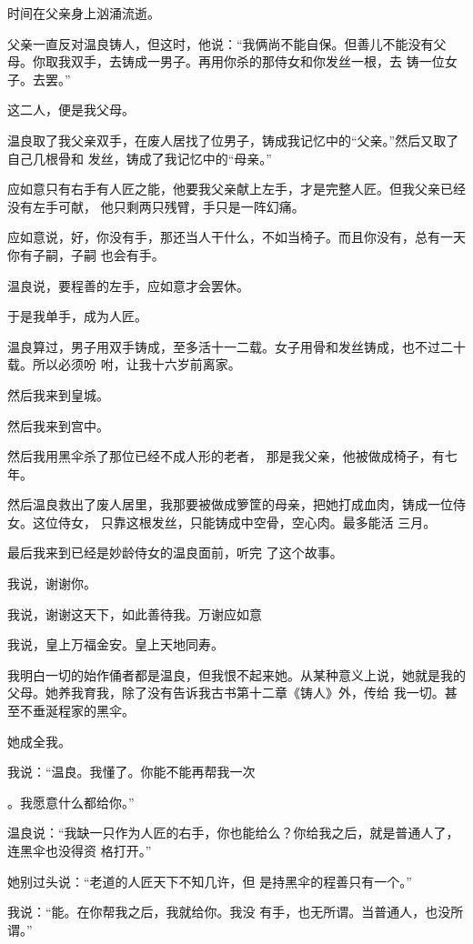 \documentclass{article}
\begin{document}
时间在父亲身上汹涌流逝。 

父亲一直反对温良铸人，但这时，他说：“我俩尚不能自保。但善儿不能没有父母。你取我双手，去铸成一男子。再用你杀的那侍女和你发丝一根，去
铸一位女子。去罢。” 


这二人，便是我父母。 

温良取了我父亲双手，在废人居找了位男子，铸成我记忆中的“父亲。”然后又取了自己几根骨和
发丝，铸成了我记忆中的“母亲。” 

应如意只有右手有人匠之能，他要我父亲献上左手，才是完整人匠。但我父亲已经没有左手可献，
他只剩两只残臂，手只是一阵幻痛。 

\newpage

应如意说，好，你没有手，那还当人干什么，不如当椅子。而且你没有，总有一天你有子嗣，子嗣
也会有手。 


温良说，要程善的左手，应如意才会罢休。 


于是我单手，成为人匠。 

温良算过，男子用双手铸成，至多活十一二载。女子用骨和发丝铸成，也不过二十载。所以必须吩
咐，让我十六岁前离家。 


然后我来到皇城。 


然后我来到宫中。 

然后我用黑伞杀了那位已经不成人形的老者，
那是我父亲，他被做成椅子，有七年。 

然后温良救出了废人居里，我那要被做成箩筐的母亲，把她打成血肉，铸成一位侍女。这位侍女，
\newpage
只靠这根发丝，只能铸成中空骨，空心肉。最多能活
三月。 

最后我来到已经是妙龄侍女的温良面前，听完
了这个故事。 


我说，谢谢你。 

我说，谢谢这天下，如此善待我。万谢应如意


我说，皇上万福金安。皇上天地同寿。 

我明白一切的始作俑者都是温良，但我恨不起来她。从某种意义上说，她就是我的父母。她养我育我，除了没有告诉我古书第十二章《铸人》外，传给
我一切。甚至不垂涎程家的黑伞。 


她成全我。 

我说：“温良。我懂了。你能不能再帮我一次

\newpage
。我愿意什么都给你。” 

温良说：“我缺一只作为人匠的右手，你也能给么？你给我之后，就是普通人了，连黑伞也没得资
格打开。” 

她别过头说：“老道的人匠天下不知几许，但
是持黑伞的程善只有一个。” 

我说：“能。在你帮我之后，我就给你。我没
有手，也无所谓。当普通人，也没所谓。” 
\end{document}
